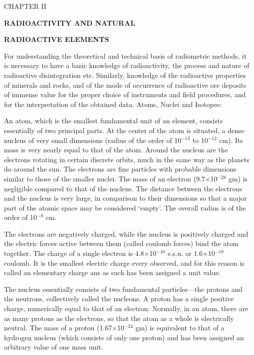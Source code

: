 \topglue 0pt
\parskip 2mm
\vskip 2cm
\centerline{CHAPTER II}
\vskip 2cm
\centerline{\bf RADIOACTIVITY AND NATURAL}
\centerline{\bf RADIOACTIVE ELEMENTS}
\vskip 2cm
{\sc For understanding the} theoretical and technical basis of radiometric methods, it is necessary to have a basic knowledge of radioactivity, the process and nature of radioactive disintegration etc.
Similarly, knowledge of the radioactive properties of minerals and rocks, and of the mode of occurrence of radioactive ore deposits of immense value for the proper choice of instruments and field procedures, and for the interpretation of the obtained data.
\bigskip
\noindent
{ Atoms, Nuclei and Isotopes:}
 
An atom, which is the smallest fundamental unit of an element, consists essentially of two principal parts.
At the center of the atom is situated, a dense nucleus of very small dimensions (radius of the order of 10$^{-13}$ to 10$^{-12}$ cm).
Its mass is very nearly equal to that of the atom.
Around the nucleus are the electrons rotating in certain discrete orbits, much in the same way as the planets do around the sun.
The electrons are fine particles with probable dimensions similar to those of the smaller nuclei.
The mass of an electron (9.7$\times$10$^{-28}$ gm) is negligible compared to that of the nucleus.
The distance between the electrons and the nucleus is very large, in comparison to their dimensions so that a major part of the atomic space may be considered `empty'.
The overall radius is of the order of 10$^{-8}$ cm.
 
The electrons are negatively charged, while the nucleus is positively charged and the electric forces active between them (called coulomb forces) bind the atom together.
The charge of a single electron is 4.8$\times$10$^{-10}$ e.s.u. or 1.6$\times$10$^{-19}$ coulomb.
It is the smallest electric charge every observed, and for this reason is called an elementary charge ans as such has been assigned a unit value.
 
The nucleus essentially consists of two fundamental particles---the protons and the neutrons, collectively called the nucleons.
A proton has a single positive charge, numerically equal to that of an electron.
Normally, in an atom, there are as many protons as the electrons, so that the atom as a whole is electrically neutral.
The mass of a proton (1.67$\times$10$^{-24}$ gm) is equivalent to that of a hydrogen nucleus (which consists of only one proton) and has been assigned an arbitrary value of one mass unit.
 
